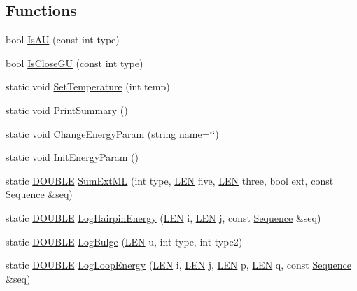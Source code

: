 \subsection*{Functions}
\begin{DoxyCompactItemize}
\item 
bool \hyperlink{namespace_rfold_1_1_parameter_a82faf0dc317bb70000edd3f34bc467b9}{Is\+A\+U} (const int type)
\item 
bool \hyperlink{namespace_rfold_1_1_parameter_a0ed77a73e79acb5e23fbb8f0a93e915f}{Is\+Close\+G\+U} (const int type)
\item 
static void \hyperlink{namespace_rfold_1_1_parameter_a308e1549312d4c50c9701331ef6acf7e}{Set\+Temperature} (int temp)
\item 
static void \hyperlink{namespace_rfold_1_1_parameter_af2fc6f49adcbd2c489ef4afa27c096dc}{Print\+Summary} ()
\item 
static void \hyperlink{namespace_rfold_1_1_parameter_a5d691fc3fd4d8c3633b25eb48ab151d0}{Change\+Energy\+Param} (string name=\char`\"{}\char`\"{})
\item 
static void \hyperlink{namespace_rfold_1_1_parameter_a3c977c57f1a40be353e62f7292eff9e4}{Init\+Energy\+Param} ()
\item 
static \hyperlink{energy__const_8hh_a8747af38b86aa2bbcda2f1b1aa0888c2}{D\+O\+U\+B\+L\+E} \hyperlink{namespace_rfold_1_1_parameter_a56e65afc08cd0ac6ec2af3a0bac07c0d}{Sum\+Ext\+M\+L} (int type, \hyperlink{energy__const_8hh_a05b49c662c073f89e86804f7856622a0}{L\+E\+N} five, \hyperlink{energy__const_8hh_a05b49c662c073f89e86804f7856622a0}{L\+E\+N} three, bool ext, const \hyperlink{class_rfold_1_1_parameter_1_1_sequence}{Sequence} \&seq)
\item 
static \hyperlink{energy__const_8hh_a8747af38b86aa2bbcda2f1b1aa0888c2}{D\+O\+U\+B\+L\+E} \hyperlink{namespace_rfold_1_1_parameter_a59afd89fc8f4ec5e7fa0ef0a3e56f302}{Log\+Hairpin\+Energy} (\hyperlink{energy__const_8hh_a05b49c662c073f89e86804f7856622a0}{L\+E\+N} i, \hyperlink{energy__const_8hh_a05b49c662c073f89e86804f7856622a0}{L\+E\+N} j, const \hyperlink{class_rfold_1_1_parameter_1_1_sequence}{Sequence} \&seq)
\item 
static \hyperlink{energy__const_8hh_a8747af38b86aa2bbcda2f1b1aa0888c2}{D\+O\+U\+B\+L\+E} \hyperlink{namespace_rfold_1_1_parameter_aa686da03e1df8a16f72153e7cbd8399e}{Log\+Bulge} (\hyperlink{energy__const_8hh_a05b49c662c073f89e86804f7856622a0}{L\+E\+N} u, int type, int type2)
\item 
static \hyperlink{energy__const_8hh_a8747af38b86aa2bbcda2f1b1aa0888c2}{D\+O\+U\+B\+L\+E} \hyperlink{namespace_rfold_1_1_parameter_a1c0e2f8427cf288a00fc615429933918}{Log\+Loop\+Energy} (\hyperlink{energy__const_8hh_a05b49c662c073f89e86804f7856622a0}{L\+E\+N} i, \hyperlink{energy__const_8hh_a05b49c662c073f89e86804f7856622a0}{L\+E\+N} j, \hyperlink{energy__const_8hh_a05b49c662c073f89e86804f7856622a0}{L\+E\+N} p, \hyperlink{energy__const_8hh_a05b49c662c073f89e86804f7856622a0}{L\+E\+N} q, const \hyperlink{class_rfold_1_1_parameter_1_1_sequence}{Sequence} \&seq)

\end{DoxyCompactItemize}
